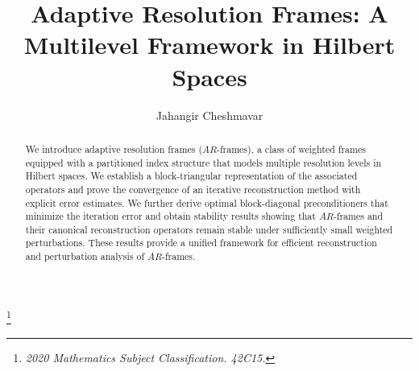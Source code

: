 \documentclass[12pt,titlepage]{amsart}
\theoremstyle{definition}
\theoremstyle{remark}
\begin{document}
\title[AR-frames]
{Adaptive Resolution Frames: A Multilevel Framework in Hilbert
Spaces }

\author{Jahangir Cheshmavar}
\author[J. Cheshmavar]{}

\address{Jahangir Cheshmavar, Department of Mathematics,
Payame Noor University, P.O.Box 19395-4697, Tehran, Iran \\
\emph{j$_{_-}$cheshmavar@pnu.ac.ir}\\
}
\thanks{\it 2020 Mathematics Subject Classification. 42C15.}
 \dedicatory{} \commby{}
\begin{abstract}
We introduce adaptive resolution frames ($AR$-frames), a class of
weighted frames equipped with a partitioned index structure that
models multiple resolution levels in Hilbert spaces. We establish
a block-triangular representation of the associated operators and
prove the convergence of an iterative reconstruction method with
explicit error estimates. We further derive optimal block-diagonal
preconditioners that minimize the iteration error and obtain
stability results showing that $AR$-frames and their canonical
reconstruction operators remain stable under sufficiently small
weighted perturbations. These results provide a unified framework
for efficient reconstruction and perturbation analysis of
$AR$-frames.
\end{abstract}
\maketitle

\end{document}
